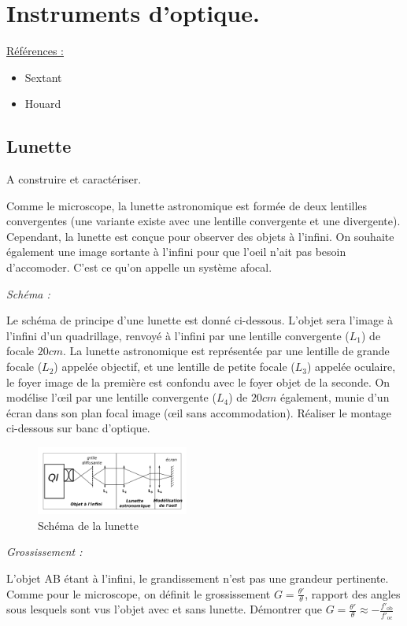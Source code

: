 \documentclass{article}%
\begin{document}
\section{Instruments d'optique.}
\underline{Références :}
\begin{itemize}
	\item Sextant 
	\item	Houard
\end{itemize}
\subsection{Lunette}
A construire et caractériser.

Comme le microscope, la lunette astronomique est formée de deux lentilles convergentes (une variante existe avec une lentille convergente et une divergente). Cependant, la lunette est conçue pour observer des objets à l'infini. On souhaite également une image sortante à l'infini pour que l'oeil n'ait pas besoin d'accomoder. C'est ce qu'on appelle un système afocal.

\textit{Schéma :}

Le schéma de principe d'une lunette est donné ci-dessous. L'objet sera l'image à l'infini d'un quadrillage, renvoyé à l'infini par une lentille convergente ($L_1$) de focale $20 cm$. La lunette astronomique est représentée par une lentille de grande focale ($L_2$) appelée objectif, et une lentille de petite focale ($L_3$) appelée oculaire, le foyer image de la première est confondu avec le foyer objet de la seconde. On modélise l’œil par une lentille convergente ($L_4$) de $20 cm$ également, munie d'un écran dans son plan focal image (œil sans accommodation). Réaliser le montage ci-dessous sur banc d'optique.

\begin{figure}
	\centerline{\includegraphics[width=5cm]{images-exp/Telescope.png}}
	\caption{Schéma de la lunette}
\end{figure}
\textit{Grossissement :}

L'objet AB étant à l'infini, le grandissement n'est pas une grandeur pertinente. Comme pour le microscope, on définit le grossissement $G=\frac{\theta'}{\theta}$, rapport des angles sous lesquels sont vus l'objet avec et sans lunette. Démontrer que
$G=\frac{\theta'}{\theta}\approx-\frac{f'_\textrm{ob}}{f'_\textrm{oc}}$
\end{document}
